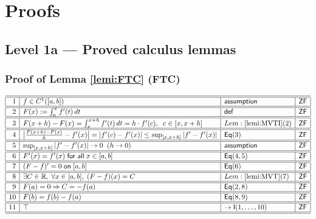 \documentclass[11pt,reqno]{amsart}
\begin{document}
\medskip


\section*{\textsf{Proofs}}


\subsection*{\textsf{Level 1a --- Proved calculus lemmas}}

\subsubsection*{Proof of Lemma \ref{lemi:FTC} (\textsf{FTC})}

\noindent$%
\begin{array}{|r|l|l|l|}
\hline\hline
1 & f\in C^{1}([a,b]) & \mathsf{assumption} & \mathsf{ZF} \\ \hline\hline
2 & F(x):=\int_{a}^{x}f^{\prime}(t)\,dt & \mathsf{def} & \mathsf{ZF} \\ \hline\hline
3 & F(x+h)-F(x)=\int_{x}^{x+h}f^{\prime}(t)\,dt=h\cdot f^{\prime}(c),\;\;c\in[x,x+h] & Lem:\ref{lemi:MVTI}(2) & \mathsf{ZF} \\ \hline\hline
4 & \bigl|\tfrac{F(x+h)-F(x)}{h}-f^{\prime}(x)\bigr|=|f^{\prime}(c)-f^{\prime}(x)|\le\sup_{[x,x+h]}|f^{\prime}-f^{\prime}(x)| & \mathsf{Eq}(3) & \mathsf{ZF} \\ \hline\hline
5 & \sup_{[x,x+h]}|f^{\prime}-f^{\prime}(x)|\to0\;\;(h\to0) & \mathsf{assumption} & \mathsf{ZF} \\ \hline\hline
6 & F^{\prime}(x)=f^{\prime}(x)\;\mathsf{for\ all}\;x\in[a,b] & \mathsf{Eq}(4,5) & \mathsf{ZF} \\ \hline\hline
7 & (F-f)^{\prime}=0\;\mathsf{on}\;[a,b] & \mathsf{Eq}(6) & \mathsf{ZF} \\ \hline\hline
8 & \exists C\in\mathbb{R},\;\forall x\in[a,b],\;(F-f)(x)=C & Lem:\ref{lemi:MVT}(7) & \mathsf{ZF} \\ \hline\hline
9 & F(a)=0\Rightarrow C=-f(a) & \mathsf{Eq}(2,8) & \mathsf{ZF} \\ \hline\hline
10 & F(b)=f(b)-f(a) & \mathsf{Eq}(8,9) & \mathsf{ZF} \\ \hline\hline
11 & \top & \to\mathsf{I}(1,\dots,10) & \mathsf{ZF} \\ \hline\hline
\end{array}%
$
\end{document}
